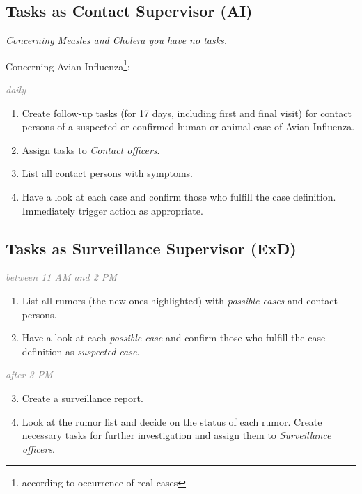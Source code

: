 \documentclass[a4paper, titlepage]{tufte-handout}
\begin{document}
\subsection{Tasks as Contact Supervisor (AI)}
\label{sec-6-2}

\emph{Concerning Measles and Cholera you have no tasks.}

Concerning Avian Influenza\footnote{according to occurrence of real cases}:

\emph{\textcolor{gray}{daily}}

\begin{enumerate}
\item Create follow-up tasks (for 17 days, including first and final visit) for contact persons of a suspected or confirmed human or animal case of Avian Influenza.

\item Assign tasks to \emph{Contact officers}.

\item List all contact persons with symptoms.

\item Have a look at each case and confirm those who fulfill the case definition. Immediately trigger action as appropriate.
\end{enumerate}

\subsection{Tasks as Surveillance Supervisor (ExD)}
\label{sec-6-3}

\emph{\textcolor{gray}{between 11 AM and 2 PM}}

\begin{enumerate}
\item List all rumors (the new ones highlighted) with \emph{possible cases} and contact persons.
\item Have a look at each \emph{possible case} and confirm those who fulfill the case definition as \emph{suspected case}.
\end{enumerate}

\emph{\textcolor{gray}{after 3 PM}}

\begin{enumerate}
\setcounter{enumi}{2}
\item Create a surveillance report.

\item Look at the rumor list and decide on the status of each rumor. Create necessary tasks for further investigation and assign them to \emph{Surveillance officers}.
\end{enumerate}
\end{document}
